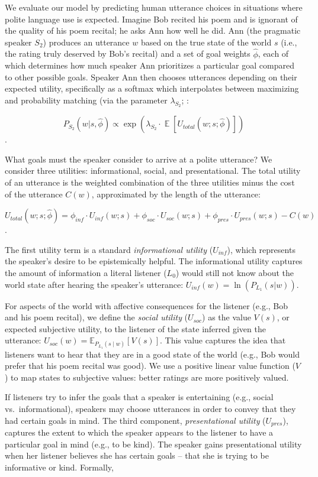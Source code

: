 \documentclass[12pt]{article}
\begin{document}
We evaluate our model by predicting human utterance choices in
situations where polite language use is expected. Imagine Bob recited
his poem and is ignorant of the quality of his poem recital; he asks Ann
how well he did. Ann (the pragmatic speaker \(S_2\)) produces an
utterance \(w\) based on the true state of the world \(s\) (i.e., the
rating truly deserved by Bob's recital) and a set of goal weights
\(\hat{\phi}\), each of which determines how much speaker Ann
prioritizes a particular goal compared to other possible goals. Speaker
Ann then chooses utterances depending on their expected utility,
specifically as a softmax which interpolates between maximizing and
probability matching (via the parameter \(\lambda_{S_2}\); \cite{goodman2013}:

\[P_{S_2}(w | s, \hat{\phi}) \propto \exp(\lambda_{S_2} \cdot \mathop{\mathbb{E}}[U_{total}(w; s; \hat{\phi})])\].

What goals must the speaker consider to arrive at a polite utterance? We
consider three utilities: informational, social, and presentational. The
total utility of an utterance is the weighted combination of the three
utilities minus the cost of the utterance \(C(w)\), approximated by the
length of the utterance:

\[U_{total}(w; s; \hat{\phi}) = \phi_{inf} \cdot U_{inf}(w; s) + \phi_{soc} \cdot U_{soc}(w; s) + \phi_{pres} \cdot U_{pres}(w; s) - C(w)\].

The first utility term is a standard \emph{informational utility}
(\(U_{inf}\)), which represents the speaker's desire to be epistemically
helpful. The informational utility captures the amount of information a
literal listener (\(L_0\)) would still not know about the world state
after hearing the speaker's utterance:
\(U_{inf}(w) = \ln(P_{L_1}(s | w))\).

For aspects of the world with affective consequences for the listener
(e.g., Bob and his poem recital), we define the \emph{social utility}
(\(U_{soc}\)) as the value \(V(s)\), or expected subjective utility, to
the listener of the state inferred given the utterance:
\(U_{soc}(w) = \mathbb{E}_{P_{L_1}(s \mid w)}[V(s)]\). This value
captures the idea that listeners want to hear that they are in a good
state of the world (e.g., Bob would prefer that his poem recital was
good). We use a positive linear value function (\(V\)) to map states to
subjective values: better ratings are more positively valued.

If listeners try to infer the goals that a speaker is entertaining
(e.g., social vs.~informational), speakers may choose utterances in
order to convey that they had certain goals in mind. The third
component, \emph{presentational utility} (\(U_{pres}\)), captures the
extent to which the speaker appears to the listener to have a particular
goal in mind (e.g., to be kind). The speaker gains presentational
utility when her listener believes she has certain goals -- that she is
trying to be informative or kind. Formally,
\end{document}
